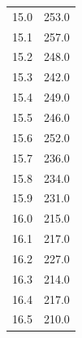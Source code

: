 \begin{table}
\begin{tabular}[t]{cc}
  15.0 & 253.0  \\
  15.1 & 257.0  \\
  15.2 & 248.0  \\
  15.3 & 242.0  \\
  15.4 & 249.0  \\
  15.5 & 246.0  \\
  15.6 & 252.0  \\
  15.7 & 236.0  \\
  15.8 & 234.0  \\
  15.9 & 231.0  \\
  16.0 & 215.0  \\
  16.1 & 217.0  \\
  16.2 & 227.0  \\
  16.3 & 214.0  \\
  16.4 & 217.0  \\
  16.5 & 210.0  \\
  \bottomrule
  \end{tabular}
  \label{tab:emission1}
\end{table}

